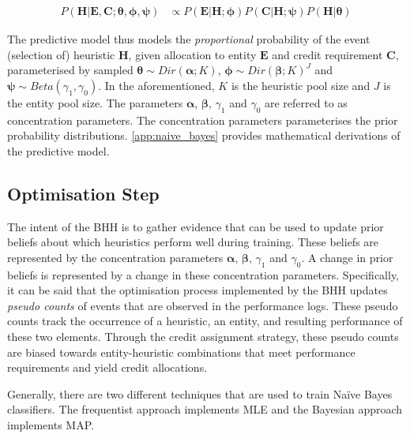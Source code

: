 \documentclass[preprint,review,12pt]{elsarticle}
\begin{document}
\begin{equation}
	\label{eq:bhh:selection_mechanism:predictive_model_prop_to}
	\begin{split}
		P(\boldsymbol{H} \vert \boldsymbol{E}, \boldsymbol{C}; \boldsymbol{\theta}, \boldsymbol{\phi}, \boldsymbol{\psi}) &\propto P(\boldsymbol{E} \vert \boldsymbol{H}; \boldsymbol{\phi}) P(\boldsymbol{C} \vert \boldsymbol{H}; \boldsymbol{\psi}) P(\boldsymbol{H} \vert \boldsymbol{\theta})
	\end{split}
\end{equation}

The predictive model thus models the \textit{proportional} probability of the event (selection of) heuristic $\boldsymbol{H}$, given allocation to entity $\boldsymbol{E}$ and credit requirement $\boldsymbol{C}$, parameterised by sampled $\boldsymbol{\theta} \sim Dir(\boldsymbol{\alpha}; K)$, $\boldsymbol{\phi} \sim Dir(\boldsymbol{\beta}; K)^{J}$ and $\boldsymbol{\psi} \sim Beta(\gamma_{1}, \gamma_{0})$. In the aforementioned, $K$ is the heuristic pool size and $J$ is the entity pool size. The parameters $\boldsymbol{\alpha}$, $\boldsymbol{\beta}$, $\gamma_{1}$ and $\gamma_{0}$ are referred to as concentration parameters. The concentration parameters parameterises the prior probability distributions. \ref{app:naive_bayes} provides mathematical derivations of the predictive model.

\subsection{Optimisation Step}\label{sec:bhh:optimisation_step}

The intent of the \acs{BHH} is to gather evidence that can be used to update prior beliefs about which heuristics perform well during training. These beliefs are represented by the concentration parameters $\boldsymbol{\alpha}$, $\boldsymbol{\beta}$, $\gamma_{1}$ and $\gamma_{0}$. A change in prior beliefs is represented by a change in these concentration parameters. Specifically, it can be said that the optimisation process implemented by the \acs{BHH} updates \textit{pseudo counts} of events that are observed in the performance logs. These pseudo counts track the occurrence of a heuristic, an entity, and resulting performance of these two elements. Through the credit assignment strategy, these pseudo counts are biased towards entity-heuristic combinations that meet performance requirements and yield credit allocations.

Generally, there are two different techniques that are used to train Naïve Bayes classifiers. The frequentist approach implements \acf{MLE} and the Bayesian approach implements \acf{MAP}.
\end{document}
